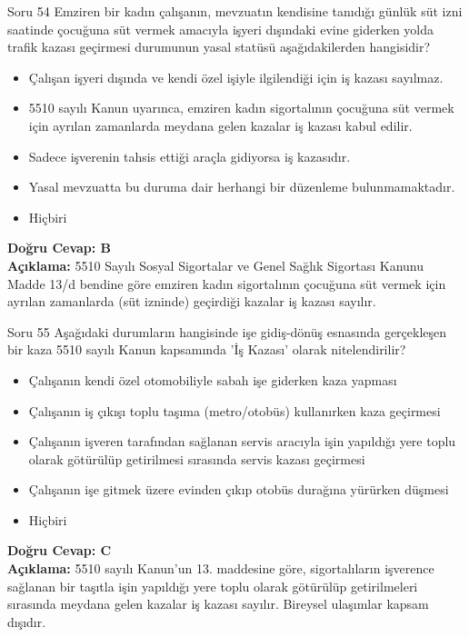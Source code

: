 \documentclass[12pt,a4paper]{article}
\begin{document}
\begin{testcard}{Soru 54}
    Emziren bir kadın çalışanın, mevzuatın kendisine tanıdığı günlük süt izni saatinde çocuğuna süt vermek amacıyla işyeri dışındaki evine giderken yolda trafik kazası geçirmesi durumunun yasal statüsü aşağıdakilerden hangisidir?
    \begin{itemize}
        \item[A)] Çalışan işyeri dışında ve kendi özel işiyle ilgilendiği için iş kazası sayılmaz.
        \item[B)] 5510 sayılı Kanun uyarınca, emziren kadın sigortalının çocuğuna süt vermek için ayrılan zamanlarda meydana gelen kazalar iş kazası kabul edilir.
        \item[C)] Sadece işverenin tahsis ettiği araçla gidiyorsa iş kazasıdır.
        \item[D)] Yasal mevzuatta bu duruma dair herhangi bir düzenleme bulunmamaktadır.
        \item[E)] Hiçbiri
    \end{itemize}
    \tcblower
    \textbf{Doğru Cevap: B} \\
    \textbf{Açıklama:} 5510 Sayılı Sosyal Sigortalar ve Genel Sağlık Sigortası Kanunu Madde 13/d bendine göre emziren kadın sigortalının çocuğuna süt vermek için ayrılan zamanlarda (süt izninde) geçirdiği kazalar iş kazası sayılır.
\end{testcard}

\begin{testcard}{Soru 55}
    Aşağıdaki durumların hangisinde işe gidiş-dönüş esnasında gerçekleşen bir kaza 5510 sayılı Kanun kapsamında 'İş Kazası' olarak nitelendirilir?
    \begin{itemize}
        \item[A)] Çalışanın kendi özel otomobiliyle sabah işe giderken kaza yapması
        \item[B)] Çalışanın iş çıkışı toplu taşıma (metro/otobüs) kullanırken kaza geçirmesi
        \item[C)] Çalışanın işveren tarafından sağlanan servis aracıyla işin yapıldığı yere toplu olarak götürülüp getirilmesi sırasında servis kazası geçirmesi
        \item[D)] Çalışanın işe gitmek üzere evinden çıkıp otobüs durağına yürürken düşmesi
        \item[E)] Hiçbiri
    \end{itemize}
    \tcblower
    \textbf{Doğru Cevap: C} \\
    \textbf{Açıklama:} 5510 sayılı Kanun'un 13. maddesine göre, sigortalıların işverence sağlanan bir taşıtla işin yapıldığı yere toplu olarak götürülüp getirilmeleri sırasında meydana gelen kazalar iş kazası sayılır. Bireysel ulaşımlar kapsam dışıdır.
\end{testcard}
\end{document}
